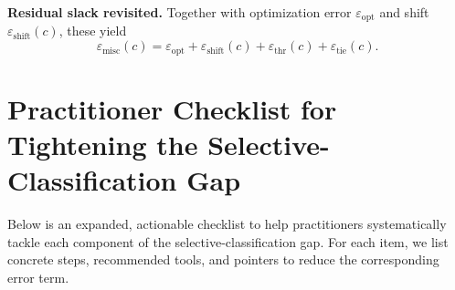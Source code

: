 \noindent\textbf{Residual slack revisited.}  Together with optimization error \(\varepsilon_{\text{opt}}\) and shift \(\varepsilon_{\text{shift}}(c)\), these yield
\begin{equation}
  \varepsilon_{\text{misc}}(c)
  = \varepsilon_{\text{opt}}
  + \varepsilon_{\text{shift}}(c)
  + \varepsilon_{\text{thr}}(c)
  + \varepsilon_{\text{tie}}(c).
\end{equation}

\section{Practitioner Checklist for Tightening the Selective-Classification Gap}
\label{app:practical-checklist}

Below is an expanded, actionable checklist to help practitioners systematically tackle each component of the selective-classification gap.  For each item, we list concrete steps, recommended tools, and pointers to reduce the corresponding error term.

